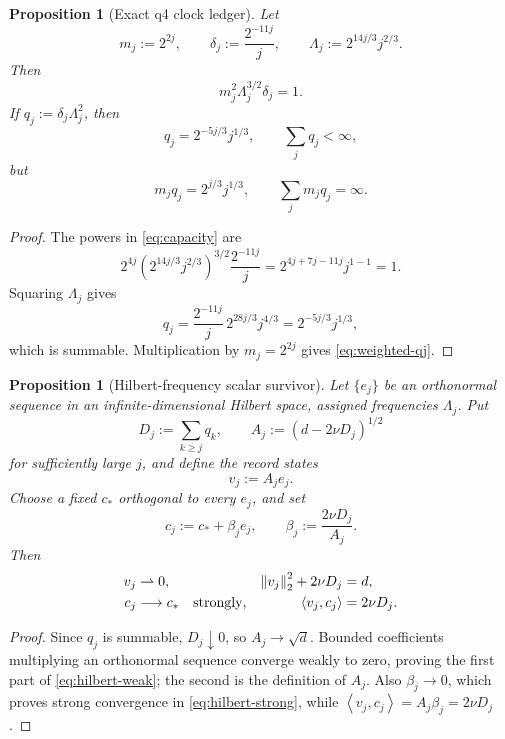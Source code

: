 \documentclass[11pt]{article}
\newtheorem{proposition}[theorem]{Proposition}
\theoremstyle{remark}
\newcommand{\norm}[1]{\left\|#1\right\|}
\newcommand{\ip}[2]{\left\langle #1,#2\right\rangle}
\newcommand{\weakto}{\rightharpoonup}
\begin{document}
\begin{proposition}[Exact q4 clock ledger]
\label{prop:zeno}
Let
\begin{equation}
\label{eq:zeno-def}
 m_j:=2^{2j},\qquad
 \delta_j:=\frac{2^{-11j}}{j},\qquad
 \Lambda_j:=2^{14j/3}j^{2/3}.
\end{equation}
Then
\begin{equation}
\label{eq:capacity}
 m_j^2\Lambda_j^{3/2}\delta_j=1.
\end{equation}
If \(q_j:=\delta_j\Lambda_j^2\), then
\begin{equation}
\label{eq:qj}
 q_j=2^{-5j/3}j^{1/3},\qquad
 \sum_jq_j<\infty,
\end{equation}
but
\begin{equation}
\label{eq:weighted-qj}
 m_jq_j=2^{j/3}j^{1/3},\qquad
 \sum_jm_jq_j=\infty.
\end{equation}
\end{proposition}

\begin{proof}
The powers in \eqref{eq:capacity} are
\[
 2^{4j}\left(2^{14j/3}j^{2/3}\right)^{3/2}
 \frac{2^{-11j}}j
 =
 2^{4j+7j-11j}j^{1-1}=1.
\]
Squaring \(\Lambda_j\) gives
\[
 q_j=
 \frac{2^{-11j}}j\,2^{28j/3}j^{4/3}
 =2^{-5j/3}j^{1/3},
\]
which is summable.  Multiplication by \(m_j=2^{2j}\) gives
\eqref{eq:weighted-qj}.
\end{proof}

\begin{proposition}[Hilbert-frequency scalar survivor]
\label{prop:hilbert}
Let \(\{e_j\}\) be an orthonormal sequence in an infinite-dimensional
Hilbert space, assigned frequencies \(\Lambda_j\).  Put
\[
 D_j:=\sum_{k\geq j}q_k,\qquad
 A_j:=(d-2\nu D_j)^{1/2}
\]
for sufficiently large \(j\), and define the record states
\[
 v_j:=A_je_j.
\]
Choose a fixed \(c_*\) orthogonal to every \(e_j\), and set
\[
 c_j:=c_*+\beta_je_j,\qquad
 \beta_j:=\frac{2\nu D_j}{A_j}.
\]
Then
\begin{align}
\label{eq:hilbert-weak}
 v_j&\weakto0,&
 \norm{v_j}_2^2+2\nu D_j&=d,\\
\label{eq:hilbert-strong}
 c_j&\longrightarrow c_*\quad\hbox{strongly},&
 \ip{v_j}{c_j}&=2\nu D_j.
\end{align}
\end{proposition}

\begin{proof}
Since \(q_j\) is summable, \(D_j\downarrow0\), so
\(A_j\to\sqrt d\).  Bounded coefficients multiplying an orthonormal
sequence converge weakly to zero, proving the first part of
\eqref{eq:hilbert-weak}; the second is the definition of \(A_j\).
Also \(\beta_j\to0\), which proves strong convergence in
\eqref{eq:hilbert-strong}, while
\(\ip{v_j}{c_j}=A_j\beta_j=2\nu D_j\).
\end{proof}
\end{document}
